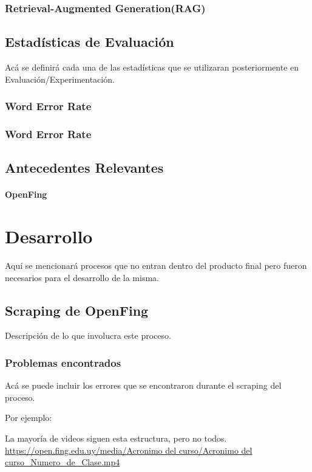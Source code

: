 \documentclass{../../prgrado}
\begin{document}
\subsection{Retrieval-Augmented Generation(RAG)}

\section{Estadísticas de Evaluación}
Acá se definirá cada una de las estadísticas que se utilizaran posteriormente en Evaluación/Experimentación.
\subsection{Word Error Rate}
\subsection{Word Error Rate}

\section{Antecedentes Relevantes}

\subsubsection{OpenFing}




\chapter{Desarrollo}
Aquí se mencionará procesos que no entran dentro del producto final pero fueron necesarios para el desarrollo de la misma. 

\section{Scraping de OpenFing}
Descripción de lo que involucra este proceso.

\subsection{Problemas encontrados}
Acá se puede incluir los errores que se encontraron durante el scraping del proceso. 

Por ejemplo:

La mayoría de videos siguen esta estructura, pero no todos.\\
\url{https://open.fing.edu.uy/media/Acronimo del curso/Acronimo del curso_Numero_de_Clase.mp4}
\end{document}

